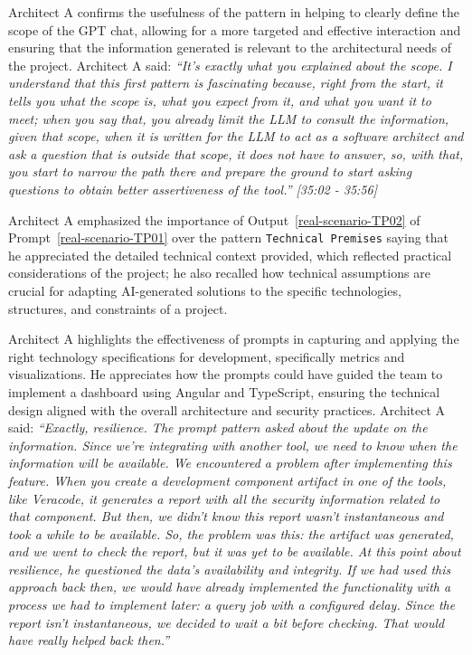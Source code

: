 Architect A confirms the usefulness of the pattern in helping to clearly define the scope of the GPT chat, allowing for a more targeted and effective interaction and ensuring that the information generated is relevant to the architectural needs of the project. Architect A said: \textit{``It's exactly what you explained about the scope. I understand that this first pattern is fascinating because, right from the start, it tells you what the scope is, what you expect from it, and what you want it to meet; when you say that, you already limit the LLM to consult the information, given that scope, when it is written for the LLM to act as a software architect and ask a question that is outside that scope, it does not have to answer, so, with that, you start to narrow the path there and prepare the ground to start asking questions to obtain better assertiveness of the tool.'' [35:02 - 35:56]}




Architect A emphasized the importance of Output~\ref{real-scenario-TP02} of Prompt~\ref{real-scenario-TP01} over the pattern \texttt{Technical Premises} saying that he appreciated the detailed technical context provided, which reflected practical considerations of the project; he also recalled how technical assumptions are crucial for adapting AI-generated solutions to the specific technologies, structures, and constraints of a project.

Architect A highlights the effectiveness of prompts in capturing and applying the right technology specifications for development, specifically metrics and visualizations. He appreciates how the prompts could have guided the team to implement a dashboard using Angular and TypeScript, ensuring the technical design aligned with the overall architecture and security practices. Architect A said: \textit{``Exactly, resilience. The prompt pattern asked about the update on the information. Since we're integrating with another tool, we need to know when the information will be available. We encountered a problem after implementing this feature. When you create a development component artifact in one of the tools, like Veracode, it generates a report with all the security information related to that component. But then, we didn't know this report wasn't instantaneous and took a while to be available. So, the problem was this: the artifact was generated, and we went to check the report, but it was yet to be available. At this point about resilience, he questioned the data's availability and integrity. If we had used this approach back then, we would have already implemented the functionality with a process we had to implement later: a query job with a configured delay.  Since the report isn't instantaneous, we decided to wait a bit before checking. That would have really helped back then.''
}

